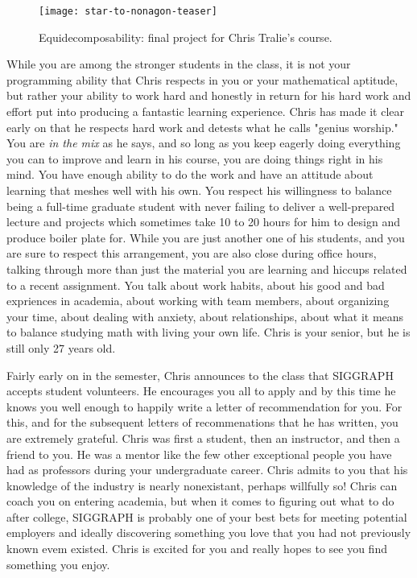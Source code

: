 \documentclass[../main.tex]{subfiles}
\begin{document}
\begin{figure}[h!]
	\centering
	\texttt{[image: star-to-nonagon-teaser]}
	\caption*{Equidecomposability: final project for Chris Tralie's course.}
\end{figure}

While you are among the stronger students in the class, it is not your programming ability that Chris respects in you or your mathematical aptitude, but rather your ability to work hard and honestly in return for his hard work and effort put into producing a fantastic learning experience. Chris has made it clear early on that he respects hard work and detests what he calls "genius worship." You are \textit{in the mix} as he says, and so long as you keep eagerly doing everything you can to improve and learn in his course, you are doing things right in his mind. You have enough ability to do the work and have an attitude about learning that meshes well with his own. You respect his willingness to balance being a full-time graduate student with never failing to deliver a well-prepared lecture and projects which sometimes take 10 to 20 hours for him to design and produce boiler plate for. While you are just another one of his students, and you are sure to respect this arrangement, you are also close during office hours, talking through more than just the material you are learning and hiccups related to a recent assignment. You talk about work habits, about his good and bad expriences in academia, about working with team members, about organizing your time, about dealing with anxiety, about relationships, about what it means to balance studying math with living your own life. Chris is your senior, but he is still only 27 years old.

Fairly early on in the semester, Chris announces to the class that SIGGRAPH accepts student volunteers. He encourages you all to apply and by this time he knows you well enough to happily write a letter of recommendation for you. For this, and for the subsequent letters of recommenations that he has written, you are extremely grateful. Chris was first a student, then an instructor, and then a friend to you. He was a mentor like the few other exceptional people you have had as professors during your undergraduate career. Chris admits to you that his knowledge of the industry is nearly nonexistant, perhaps willfully so! Chris can coach you on entering academia, but when it comes to figuring out what to do after college, SIGGRAPH is probably one of your best bets for meeting potential employers and ideally discovering something you love that you had not previously known evem existed. Chris is excited for you and really hopes to see you find something you enjoy.
\end{document}

